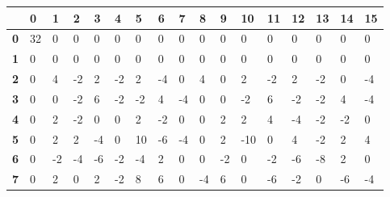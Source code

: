 \begin{longtable}[c]{|l|l|l|l|l|l|l|l|l|l|l|l|l|l|l|l|l|}
\hline
            & \textbf{0} & \textbf{1} & \textbf{2} & \textbf{3} & \textbf{4} & \textbf{5} & \textbf{6} & \textbf{7} & \textbf{8} & \textbf{9} & \textbf{10} & \textbf{11} & \textbf{12} & \textbf{13} & \textbf{14} & \textbf{15} \\ \hline
\endfirsthead
%
\endhead
%
\textbf{0}  & 32         & 0          & 0          & 0          & 0          & 0          & 0          & 0          & 0          & 0          & 0           & 0           & 0           & 0           & 0           & 0           \\ \hline
\textbf{1}  & 0          & 0          & 0          & 0          & 0          & 0          & 0          & 0          & 0          & 0          & 0           & 0           & 0           & 0           & 0           & 0           \\ \hline
\textbf{2}  & 0          & 4          & -2         & 2          & -2         & 2          & -4         & 0          & 4          & 0          & 2           & -2          & 2           & -2          & 0           & -4          \\ \hline
\textbf{3}  & 0          & 0          & -2         & 6          & -2         & -2         & 4          & -4         & 0          & 0          & -2          & 6           & -2          & -2          & 4           & -4          \\ \hline
\textbf{4}  & 0          & 2          & -2         & 0          & 0          & 2          & -2         & 0          & 0          & 2          & 2           & 4           & -4          & -2          & -2          & 0           \\ \hline
\textbf{5}  & 0          & 2          & 2          & -4         & 0          & 10         & -6         & -4         & 0          & 2          & -10         & 0           & 4           & -2          & 2           & 4           \\ \hline
\textbf{6}  & 0          & -2         & -4         & -6         & -2         & -4         & 2          & 0          & 0          & -2         & 0           & -2          & -6          & -8          & 2           & 0           \\ \hline
\textbf{7}  & 0          & 2          & 0          & 2          & -2         & 8          & 6          & 0          & -4         & 6          & 0           & -6          & -2          & 0           & -6          & -4          \\ \hline

\end{longtable}
